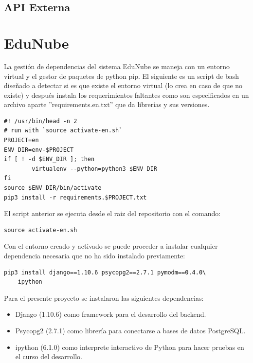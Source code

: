 
%
%

\subsection{API Externa}

\section{EduNube}


La gestión de dependencias del sistema EduNube se maneja con un entorno virtual y el gestor de paquetes de python pip. El siguiente es un script de bash diseñado a detectar si es que existe el entorno virtual (lo crea en caso de que no existe) y después instala los requerimientos faltantes como son especificados en un archivo aparte ''requirements.en.txt'' que da librerías y sus versiones.

\begin{lstlisting}
#! /usr/bin/head -n 2
# run with `source activate-en.sh`
PROJECT=en
ENV_DIR=env-$PROJECT
if [ ! -d $ENV_DIR ]; then
        virtualenv --python=python3 $ENV_DIR
fi
source $ENV_DIR/bin/activate
pip3 install -r requirements.$PROJECT.txt
\end{lstlisting}

El script anterior se ejecuta desde el raiz del repositorio con el comando:

\begin{lstlisting}
source activate-en.sh
\end{lstlisting}

Con el entorno creado y activado se puede proceder a instalar cualquier dependencia necesaria que no ha sido instalado previamente:

\begin{lstlisting}
pip3 install django==1.10.6 psycopg2==2.7.1 pymodm==0.4.0\
	ipython
\end{lstlisting}

Para el presente proyecto se instalaron las siguientes dependencias:
\begin{itemize}
	\item Django (1.10.6) como framework para el desarrollo del backend.
    \item Psycopg2 (2.7.1) como librería para conectarse a bases de datos PostgreSQL.
    \item ipython (6.1.0) como interprete interactivo de Python para hacer pruebas en el curso del desarrollo.
\end{itemize}

